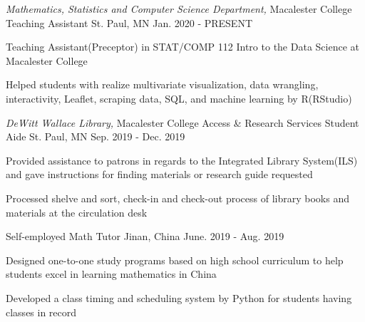 

\begin{cventries}

  \cventry
    {\textit{Mathematics, Statistics and Computer Science Department,} Macalester College} %
    {Teaching Assistant} %
    {St. Paul, MN} %
    {Jan. 2020 - PRESENT} %
    {
      \begin{cvitems} %
        \item {Teaching Assistant(Preceptor) in STAT/COMP 112 Intro to the Data Science at Macalester College}
        \item {Helped students with realize multivariate visualization, data wrangling, interactivity, Leaflet, scraping data, SQL, and machine learning by R(RStudio)}
      \end{cvitems}
    }

  \cventry
    {\textit{DeWitt Wallace Library,} Macalester College} %
    {Access \& Research Services Student Aide} %
    {St. Paul, MN} %
    {Sep. 2019 - Dec. 2019} %
    {
      \begin{cvitems} %
        \item {Provided assistance to patrons in regards to the Integrated Library System(ILS) and gave instructions for finding materials or research guide requested}
        \item {Processed shelve and sort, check-in and check-out process of library books and materials at the circulation desk}
      \end{cvitems}
    }

   \cventry
    {Self-employed} %
    {Math Tutor} %
    {Jinan, China} %
    {June. 2019 - Aug. 2019} %
    {
      \begin{cvitems} %
        \item {Designed one-to-one study programs based on high school curriculum to help students excel in learning mathematics in China}
        \item {Developed a class timing and scheduling system by Python for students having classes in record}
      \end{cvitems}
    }
    
\end{cventries}
